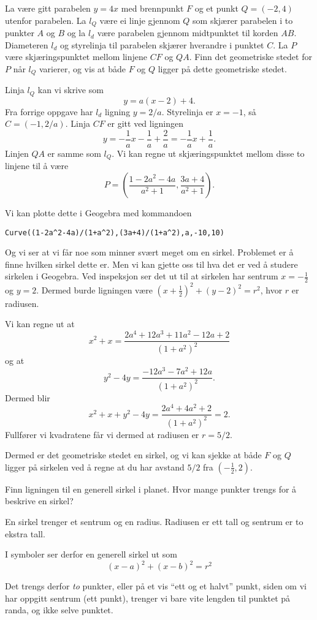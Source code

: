\documentclass[11pt, norsk]{article}
\begin{document}
\begin{oppg}
La være gitt parabelen $y=4x$ med brennpunkt $F$ og et punkt $Q=(-2,4)$ utenfor parabelen. La $l_Q$ være ei linje gjennom $Q$ som skjærer parabelen i to punkter $A$ og $B$ og la $l_d$ være parabelen gjennom midtpunktet til korden $AB$. Diameteren $l_d$ og styrelinja til parabelen skjærer hverandre i punktet $C$. La $P$ være skjæringspunktet mellom linjene $CF$ og $QA$. Finn det geometriske stedet for $P$ når $l_Q$ varierer, og vis at både $F$ og $Q$ ligger på dette geometriske stedet.
\end{oppg}

\begin{losn}
Linja $l_Q$ kan vi skrive som
$$
y = a(x-2)+4.
$$
Fra forrige oppgave har $l_d$ ligning $y=2/a$. Styrelinja er $x=-1$, så $C=(-1,2/a)$. Linja $CF$ er gitt ved ligningen
$$
y = -\frac 1a x - \frac 1a + \frac 2a = -\frac 1a x +\frac 1a.
$$
Linjen $QA$ er samme som $l_Q$. Vi kan regne ut skjæringspunktet mellom disse to linjene til å være
$$
P = \left( \frac{1-2a^2-4a}{a^2+1} , \frac{3a+4}{a^2+1} \right).
$$

Vi kan plotte dette i Geogebra med kommandoen 
\begin{verbatim}
Curve((1-2a^2-4a)/(1+a^2),(3a+4)/(1+a^2),a,-10,10)
\end{verbatim}
Og vi ser at vi får noe som minner svært meget om en sirkel. Problemet er å finne hvilken sirkel dette er. Men vi kan gjette oss til hva det er ved å studere sirkelen i Geogebra. Ved inspeksjon ser det ut til at sirkelen har sentrum $x=-\frac 12$ og $y=2$. Dermed burde ligningen være $(x+\frac 12)^2+(y-2)^2=r^2$, hvor $r$ er radiusen.

Vi kan regne ut at
$$
x^2+x = \frac{2a^4+12a^3+11a^2-12a+2}{(1+a^2)^2}
$$
og at
$$
y^2-4y = \frac{-12a^3-7a^2+12a}{(1+a^2)^2}.
$$
Dermed blir
$$
x^2+x+y^2-4y = \frac{2a^4+4a^2+2}{(1+a^2)^2} = 2.
$$
Fullfører vi kvadratene får vi dermed at radiusen er $r= 5/2$.

Dermed er det geometriske stedet en sirkel, og vi kan sjekke at både $F$ og $Q$ ligger på sirkelen ved å regne at du har avstand $5/2$ fra $(-\frac 12,2)$.
\end{losn}

\begin{oppg}
Finn ligningen til en generell sirkel i planet. Hvor mange punkter trengs for å beskrive en sirkel?
\end{oppg}

\begin{losn}
En sirkel trenger et sentrum og en radius. Radiusen er ett tall og sentrum er to ekstra tall.

I symboler ser derfor en generell sirkel ut som
$$
(x-a)^2+(x-b)^2=r^2
$$

Det trengs derfor \emph{to} punkter, eller på et vis ``ett og et halvt'' punkt, siden om vi har oppgitt sentrum (ett punkt), trenger vi bare vite lengden til punktet på randa, og ikke selve punktet.
\end{losn}
\end{document}
